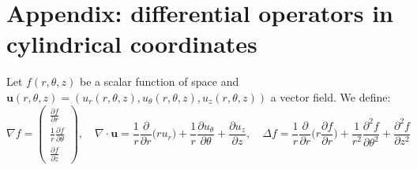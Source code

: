 \documentclass[11pt,a4paper]{article}
\begin{document}
\section*{Appendix: differential operators in cylindrical coordinates}
\noindent Let $f(r,\theta,z)$ be a scalar function of space and $\boldsymbol{u}(r,\theta,z) = (u_r(r,\theta,z), u_\theta(r,\theta,z), u_z(r,\theta,z))$ a vector field. We define:
\begin{equation*}
\nabla f = \left(
\begin{array}{c}
\displaystyle\frac{\partial f}{\partial r}\\[1em]
\displaystyle\frac{1}{r}\frac{\partial f}{\partial \theta}\\[1em]
\displaystyle\frac{\partial f}{\partial z}
\end{array}
\right), 
\quad \nabla \cdot \boldsymbol{u} = \frac{1}{r} \frac{\partial}{\partial r}\bigg( r u_r\bigg) + \frac{1}{r} \frac{\partial u_\theta}{\partial \theta} + \frac{\partial u_z}{\partial z},
\quad \Delta f = \frac{1}{r} \frac{\partial}{\partial r}\bigg( r \frac{\partial f}{\partial r}\bigg) + \frac{1}{r^2} \frac{\partial^2 f}{\partial \theta^2} + \frac{\partial^2 f}{\partial z^2}
\end{equation*}
%

%
%
\end{document}
